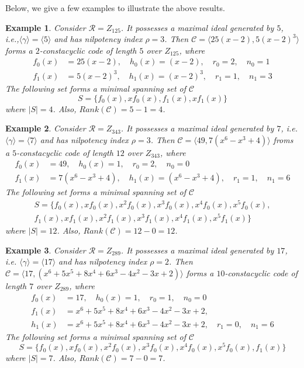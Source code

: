 \documentclass[12pt,a4paper]{article}
\newtheorem{example}{Example}
\begin{document}
Below, we give a few examples to illustrate the above results.
\begin{example}\label{ex:first}
    Consider $\mathcal{R}=Z_{125}$. It possesses a maximal ideal generated by $5$, i.e.,$\langle\gamma\rangle=\langle5\rangle$ and has nilpotency index $\rho=3$. Then $\mathcal{C}=\langle25(x-2),5(x-2)^3\rangle$ forms a $2$-constacyclic code of length $5$ over $Z_{125}$, where
    \[
    \begin{aligned}
        f_0(x)&=25(x-2), \quad h_0(x)=(x-2), \quad r_0=2,\quad n_0=1 \\
        f_1(x)&=5(x-2)^3, \quad h_1(x)=(x-2)^3, \quad r_1=1,\quad n_1=3
    \end{aligned}
    \]
    The following set forms a minimal spanning set of $\mathcal{C}$
    \[
    S=\{f_0(x),xf_0(x),f_1(x),xf_1(x)\}
    \]
    where $|S|=4$. Also, $Rank(\mathcal{C})=5-1=4$.
\end{example}

\begin{example}\label{ex:second}
    Consider $\mathcal{R}=Z_{343}$. It possesses a maximal ideal generated by $7$, i.e. $\langle\gamma\rangle=\langle7\rangle$ and has nilpotency index $\rho=3$. Then $\mathcal{C}=\langle49,7(x^6-x^3+4)\rangle$ froms a $5$-constacyclic code of length $12$ over $Z_{343}$, where
    \[
    \begin{aligned}
        f_0(x)&=49, \quad h_0(x)=1, \quad r_0=2,\quad n_0=0 \\
        f_1(x)&=7(x^6-x^3+4), \quad h_1(x)=(x^6-x^3+4), \quad r_1=1,\quad n_1=6
    \end{aligned}
    \]
    The following set forms a minimal spanning set of $\mathcal{C}$
    \[
    \begin{split}
    S=\{
    f_0(x), xf_0(x), x^2f_0(x), x^3f_0(x), x^4f_0(x), x^5f_0(x),\\
    f_1(x), xf_1(x), x^2f_1(x), x^3f_1(x), x^4f_1(x), x^5f_1(x)
    \}
    \end{split}
    \]
    where $|S|=12$. Also, $Rank(\mathcal{C})=12-0=12$.
\end{example}

\begin{example}\label{ex:third}
    Consider $\mathcal{R}=Z_{289}$. It possesses a maximal ideal generated by $17$, i.e. $\langle\gamma\rangle=\langle17\rangle$ and has nilpotency index $\rho=2$. Then $\mathcal{C}=\langle17,(x^6+5x^5+8x^4+6x^3-4x^2-3x+2)\rangle$ forms a $10$-constacyclic code of length $7$ over $Z_{289}$, where
    \[
    \begin{aligned}
        f_0(x)&=17, \quad h_0(x)=1, \quad r_0=1,\quad n_0=0 \\
        f_1(x)&=x^6+5x^5+8x^4+6x^3-4x^2-3x+2,\\ h_1(x)&=x^6+5x^5+8x^4+6x^3-4x^2-3x+2,\quad r_1=0,\quad n_1=6
    \end{aligned}
    \]
    The following set forms a minimal spanning set of $\mathcal{C}$
    \[
    S=\{f_0(x),xf_0(x),x^2f_0(x),x^3f_0(x),x^4f_0(x),x^5f_0(x),f_1(x)\}
    \]
    where $|S|=7$. Also, $Rank(\mathcal{C})=7-0=7$.
\end{example}
\end{document}
